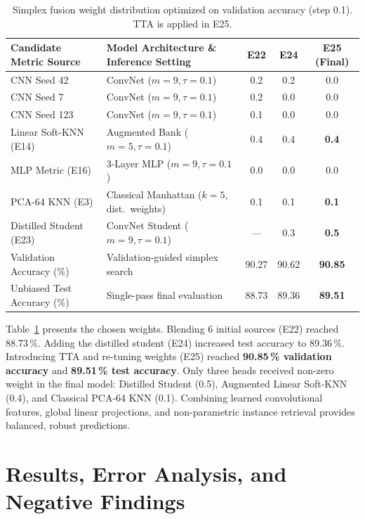 \documentclass[10pt,a4paper]{article}
\begin{document}
\begin{table}[!htb]
\centering\footnotesize
\caption{Simplex fusion weight distribution optimized on validation accuracy (step 0.1). TTA is applied in E25.}
\label{tab:fusion}
\begin{tabular}{llccc}
\toprule
Candidate Metric Source & Model Architecture \& Inference Setting & E22 & E24 & E25 (Final) \\
\midrule
CNN Seed 42           & ConvNet ($m=9, \tau=0.1$) & 0.2 & 0.2 & 0.0 \\
CNN Seed 7            & ConvNet ($m=9, \tau=0.1$) & 0.2 & 0.0 & 0.0 \\
CNN Seed 123          & ConvNet ($m=9, \tau=0.1$) & 0.1 & 0.0 & 0.0 \\
Linear Soft-KNN (E14) & Augmented Bank ($m=5, \tau=0.1$) & 0.4 & 0.4 & \textbf{0.4} \\
MLP Metric (E16)      & 3-Layer MLP ($m=9, \tau=0.1$) & 0.0 & 0.0 & 0.0 \\
PCA-64 KNN (E3)       & Classical Manhattan ($k=5$, dist.\ weights) & 0.1 & 0.1 & \textbf{0.1} \\
Distilled Student (E23) & ConvNet Student ($m=9, \tau=0.1$) & --- & 0.3 & \textbf{0.5} \\
\midrule
Validation Accuracy (\%) & Validation-guided simplex search & 90.27 & 90.62 & \textbf{90.85} \\
Unbiased Test Accuracy (\%) & Single-pass final evaluation & 88.73 & 89.36 & \textbf{89.51} \\
\bottomrule
\end{tabular}
\end{table}

Table~\ref{tab:fusion} presents the chosen weights. Blending 6 initial sources (E22) reached 88.73\,\%. Adding the distilled student (E24) increased test accuracy to 89.36\,\%. Introducing TTA and re-tuning weights (E25) reached \textbf{90.85\,\% validation accuracy} and \textbf{89.51\,\% test accuracy}. Only three heads received non-zero weight in the final model: Distilled Student (0.5), Augmented Linear Soft-KNN (0.4), and Classical PCA-64 KNN (0.1). Combining learned convolutional features, global linear projections, and non-parametric instance retrieval provides balanced, robust predictions.

\section{Results, Error Analysis, and Negative Findings}\label{sec:results}
\end{document}
